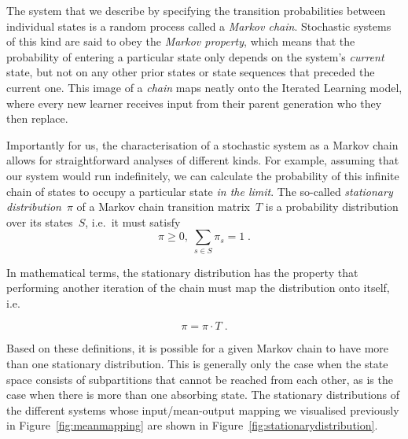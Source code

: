 The system that we describe by specifying the transition probabilities between individual states is a random process called a \emph{Markov chain}. Stochastic systems of this kind are said to obey the \emph{Markov property}, which means that the probability of entering a particular state only depends on the system's \emph{current} state, but not on any other prior states or state sequences that preceded the current one. This image of a \emph{chain} maps neatly onto the Iterated Learning model, where every new learner receives input from their parent generation who they then replace.

Importantly for us, the characterisation of a stochastic system as a Markov chain allows for straightforward analyses of different kinds. For example, assuming that our system would run indefinitely, we can calculate the probability of this infinite chain of states to occupy a particular state \emph{in the limit}. The so-called \emph{stationary distribution}~$\pi$ of a Markov chain transition matrix~$T$ is a probability distribution over its states~$S$, i.e.~it must satisfy
\begin{equation}
\pi\ge0,\; \sum_{s\in S} \pi_s = 1\;.
\end{equation}

In mathematical terms, the stationary distribution has the property that performing another iteration of the chain must map the distribution onto itself, i.e.

\begin{equation}\label{eq:stationarydistribution}
\pi = \pi\cdot T\;.
\end{equation}

Based on these definitions, it is possible for a given Markov chain to have more than one stationary distribution. This is generally only the case when the state space consists of subpartitions that cannot be reached from each other, as is the case when there is more than one absorbing state. The stationary distributions of the different systems whose input/mean-output mapping we visualised previously in Figure~\ref{fig:meanmapping} are shown in Figure~\ref{fig:stationarydistribution}.

